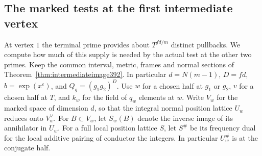\documentclass[a4paper,11pt]{article}
\theoremstyle{definition}
\theoremstyle{remark}
\numberwithin{equation}{section}
\begin{document}
\subsection{The marked tests at the first intermediate vertex}
\label{sec:markedline394}

At vertex \(1\) the terminal prime provides about \(T^{fd/m}\)
distinct pullbacks. We compute how much of this supply is needed
by the actual test at the other two primes. Keep the common
interval, metric, frames and normal sections of
Theorem~\ref{thm:intermediateimage392}. In particular \(d=N(m-1)\),
\(D=fd\), \(b=\exp(x^\varepsilon)\), and \(Q_g=(g_1g_2)^D\).
Use \(w\) for a chosen half at \(g_1\) or \(g_2\), \(v\) for
a chosen half at \(T\), and \(k_w\) for the field of \(q_w\)
elements at \(w\). Write \(V_w\) for the marked space of dimension
\(d\), so that the integral normal position lattice \(U_w\)
reduces onto \(V_w^\vee\). For \(B\subset V_w\), let
\(S_w(B)\) denote the inverse image of its annihilator in \(U_w\).
For a full local position lattice \(S\), let \(S^\#\) be its
frequency dual for the local additive pairing of conductor the
integers. In particular \(U_w^\#\) is at the conjugate half.
\end{document}
